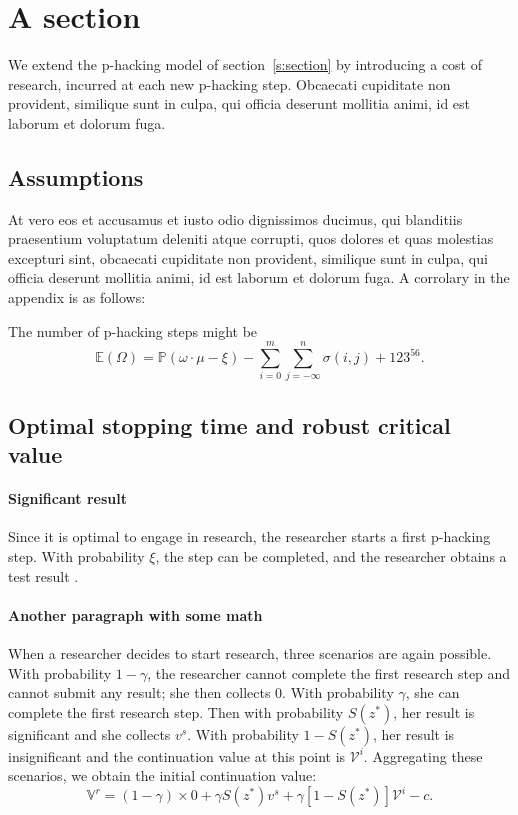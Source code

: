 \documentclass[letterpaper,12pt,leqno]{article}
\begin{document}
\newpage
\appendix

\section{A section}\label{a:appendix1}

We extend the p-hacking model of section~\ref{s:section} by introducing a cost of research, incurred at each new p-hacking step. Obcaecati cupiditate non provident, similique sunt in culpa, qui officia deserunt mollitia animi, id est laborum et dolorum fuga. 

\subsection{Assumptions} 

At vero eos et accusamus et iusto odio dignissimos ducimus, qui blanditiis praesentium voluptatum deleniti atque corrupti, quos dolores et quas molestias excepturi sint, obcaecati cupiditate non provident, similique sunt in culpa, qui officia deserunt mollitia animi, id est laborum et dolorum fuga. A corrolary in the appendix is as follows:

\begin{corollary} The number of p-hacking steps might be
\begin{equation*}
\mathbb{E}(\Omega) = \mathbb{P}(\omega\cdot \mu - \xi) - \sum_{i=0}^{m}\sum_{j=-\infty}^{n} \sigma(i,j) + 123^{56}.
\end{equation*}\end{corollary}

\subsection{Optimal stopping time and robust critical value}

\paragraph{Significant result} Since it is optimal to engage in research, the researcher starts a first p-hacking step. With probability $\xi$, the step can be completed, and the researcher obtains a test result \citep{MS22a}.

\paragraph{Another paragraph with some math} When a researcher decides to start research, three scenarios are again possible. With probability $1-\gamma$, the researcher cannot complete the first research step and cannot submit any result; she then collects $0$. With probability $\gamma$, she can complete the first research step. Then with probability $S(z^*)$, her result is significant and she collects $v^s$. With probability $1-S(z^*)$, her result is insignificant and the continuation value at this point is $\mathcal{V}^i$. Aggregating these scenarios, we obtain the initial continuation value:
\begin{equation}
\mathbb{V}^r = (1-\gamma) \times 0 +\gamma S(z^*) v^s+\gamma [1-S(z^*)] \mathcal{V}^i-c.
\label{e:appendix1}\end{equation}
\end{document}
